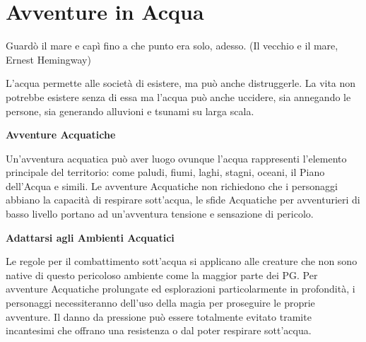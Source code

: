 \section{Avventure in Acqua}

\label{avventure-in-acqua}
\begin{enfasi}{
Guardò il mare e capì fino a che punto era solo, adesso. (Il vecchio e il mare, Ernest Hemingway)}\end{enfasi}

\begin{multicols}{2}

L'acqua permette alle società di esistere, ma può anche distruggerle. La vita non potrebbe esistere senza di essa ma l'acqua può anche uccidere, sia annegando le persone, sia generando alluvioni e tsunami su larga scala.

\textbf{Avventure Acquatiche}

Un'avventura acquatica può aver luogo ovunque l'acqua rappresenti l'elemento principale del territorio: come paludi, fiumi, laghi, stagni, oceani, il Piano dell'Acqua e simili. Le avventure Acquatiche non richiedono che i personaggi abbiano la capacità di respirare sott'acqua, le sfide Acquatiche per avventurieri di basso livello portano ad un'avventura tensione e sensazione di pericolo.

\textbf{Adattarsi agli Ambienti Acquatici}

Le regole per il combattimento sott'acqua si applicano alle creature che non sono native di questo pericoloso ambiente come la maggior parte dei PG. Per avventure Acquatiche prolungate ed esplorazioni particolarmente in profondità, i personaggi necessiteranno dell'uso della magia per proseguire le proprie avventure. Il danno da pressione può essere totalmente evitato tramite incantesimi che offrano una resistenza o dal poter respirare sott'acqua.

\medskip

\begin{center}



\end{center}
\end{multicols}
